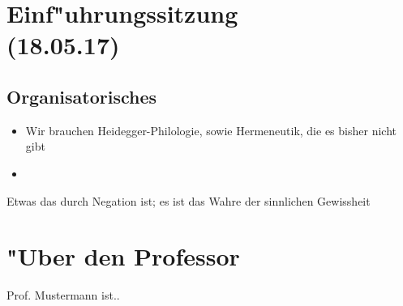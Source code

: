 \documentclass[emulatestandardclasses]{scrartcl}
\begin{document}
\tableofcontents
\listoffigures
\newpage


\section{Einf"uhrungssitzung\\(18.05.17)}

\subsection{Organisatorisches}

\begin{itemize}
  \item Wir brauchen Heidegger-Philologie, sowie Hermeneutik, die es bisher nicht gibt
  \item 
\end{itemize}


\begin{description}[leftmargin=!,labelwidth=\widthof{\bfseries Erscheinendes Bewusstsein}]
  \item[Reines Sein]
  \item[Allgemeines] Etwas das durch Negation ist; es ist das Wahre der sinnlichen Gewissheit
\end{description}


\newpage
\section{"Uber den Professor}
Prof. Mustermann ist..


\end{document}
